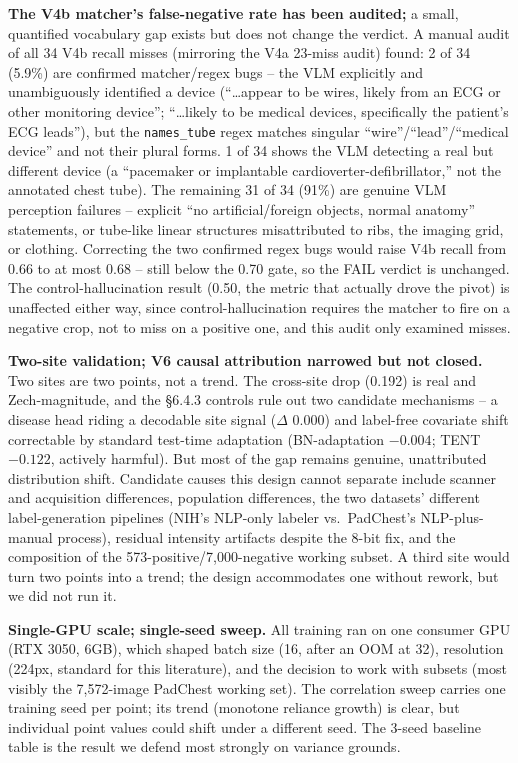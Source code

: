 \documentclass{ieeeaccess}
\begin{document}
\textbf{The V4b matcher's false-negative rate has been audited;} a small,
quantified vocabulary gap exists but does not change the verdict. A manual
audit of all 34 V4b recall misses (mirroring the V4a 23-miss audit) found: 2
of 34 (5.9\%) are confirmed matcher/regex bugs -- the VLM explicitly and
unambiguously identified a device (``\ldots appear to be wires, likely from
an ECG or other monitoring device''; ``\ldots likely to be medical devices,
specifically the patient's ECG leads''), but the \texttt{names\_tube} regex
matches singular ``wire''/``lead''/``medical device'' and not their plural
forms. 1 of 34 shows the VLM detecting a real but different device (a
``pacemaker or implantable cardioverter-defibrillator,'' not the annotated
chest tube). The remaining 31 of 34 (91\%) are genuine VLM perception
failures -- explicit ``no artificial/foreign objects, normal anatomy''
statements, or tube-like linear structures misattributed to ribs, the
imaging grid, or clothing. Correcting the two confirmed regex bugs would
raise V4b recall from 0.66 to at most 0.68 -- still below the 0.70 gate, so
the FAIL verdict is unchanged. The control-hallucination result (0.50, the
metric that actually drove the pivot) is unaffected either way, since
control-hallucination requires the matcher to fire on a negative crop, not
to miss on a positive one, and this audit only examined misses.

\textbf{Two-site validation; V6 causal attribution narrowed but not closed.}
Two sites are two points, not a trend. The cross-site drop (0.192) is real
and Zech-magnitude, and the \S6.4.3 controls rule out two candidate
mechanisms -- a disease head riding a decodable site signal ($\Delta$ 0.000)
and label-free covariate shift correctable by standard test-time adaptation
(BN-adaptation $-0.004$; TENT $-0.122$, actively harmful). But most of the
gap remains genuine, unattributed distribution shift. Candidate causes this
design cannot separate include scanner and acquisition differences,
population differences, the two datasets' different label-generation
pipelines (NIH's NLP-only labeler vs.\ PadChest's NLP-plus-manual process),
residual intensity artifacts despite the 8-bit fix, and the composition of
the 573-positive/7,000-negative working subset. A third site would turn two
points into a trend; the design accommodates one without rework, but we did
not run it.

\textbf{Single-GPU scale; single-seed sweep.} All training ran on one
consumer GPU (RTX 3050, 6GB), which shaped batch size (16, after an OOM at
32), resolution (224px, standard for this literature), and the decision to
work with subsets (most visibly the 7,572-image PadChest working set). The
correlation sweep carries one training seed per point; its trend (monotone
reliance growth) is clear, but individual point values could shift under a
different seed. The 3-seed baseline table is the result we defend most
strongly on variance grounds.
\end{document}
